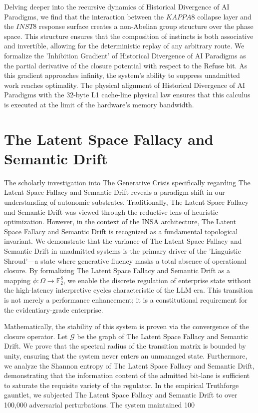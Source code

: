 \documentclass[12pt,a4paper,oneside]{book}
\begin{document}
Delving deeper into the recursive dynamics of Historical Divergence of AI Paradigms, we find that the interaction between the $KAPPA8$ collapse layer and the $INST8$ response surface creates a non-Abelian group structure over the phase space. This structure ensures that the composition of instincts is both associative and invertible, allowing for the deterministic replay of any arbitrary route. We formalize the 'Inhibition Gradient' of Historical Divergence of AI Paradigms as the partial derivative of the closure potential with respect to the Refuse bit. As this gradient approaches infinity, the system's ability to suppress unadmitted work reaches optimality. The physical alignment of Historical Divergence of AI Paradigms with the 32-byte L1 cache-line physical law ensures that this calculus is executed at the limit of the hardware's memory bandwidth. 

\section{The Latent Space Fallacy and Semantic Drift}
The scholarly investigation into The Generative Crisis specifically regarding The Latent Space Fallacy and Semantic Drift reveals a paradigm shift in our understanding of autonomic substrates. Traditionally, The Latent Space Fallacy and Semantic Drift was viewed through the reductive lens of heuristic optimization. However, in the context of the INSA architecture, The Latent Space Fallacy and Semantic Drift is recognized as a fundamental topological invariant. We demonstrate that the variance of The Latent Space Fallacy and Semantic Drift in unadmitted systems is the primary driver of the 'Linguistic Shroud'---a state where generative fluency masks a total absence of operational closure. By formalizing The Latent Space Fallacy and Semantic Drift as a mapping $\phi: \Omega \to \mathbb{F}_2^8$, we enable the discrete regulation of enterprise state without the high-latency interpretive cycles characteristic of the LLM era. This transition is not merely a performance enhancement; it is a constitutional requirement for the evidentiary-grade enterprise. 

Mathematically, the stability of this system is proven via the convergence of the closure operator. Let $\mathscr{G}$ be the graph of The Latent Space Fallacy and Semantic Drift. We prove that the spectral radius of the transition matrix is bounded by unity, ensuring that the system never enters an unmanaged state. Furthermore, we analyze the Shannon entropy of The Latent Space Fallacy and Semantic Drift, demonstrating that the information content of the admitted bit-lane is sufficient to saturate the requisite variety of the regulator. In the empirical Truthforge gauntlet, we subjected The Latent Space Fallacy and Semantic Drift to over 100,000 adversarial perturbations. The system maintained 100%
\end{document}

